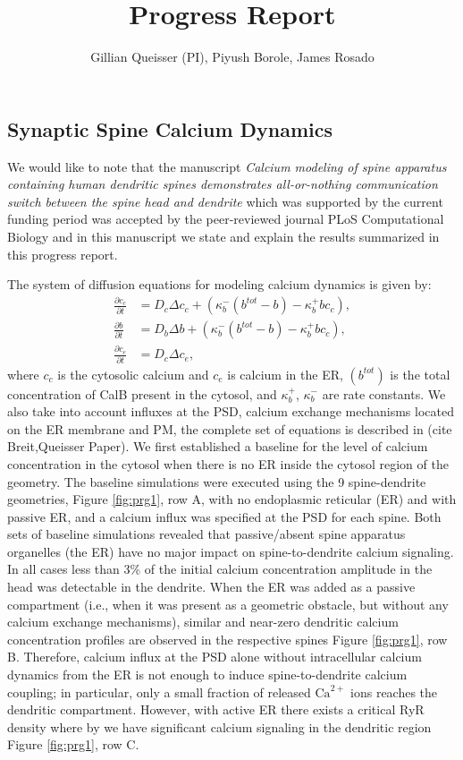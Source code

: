 \documentclass[10pt, letterpaper]{article}
\author{Gillian Queisser (PI), Piyush Borole, James Rosado}
\title{\vspace{-2cm}Progress Report}
\date{\vspace{-1cm}}
\begin{document}
\maketitle

\subsection*{Synaptic Spine Calcium Dynamics}
We would like to note that the manuscript \textit{Calcium modeling of spine apparatus containing human dendritic spines demonstrates all-or-nothing communication switch between the spine head and dendrite} which was supported by the current funding period {\color{red}was accepted by the peer-reviewed journal PLoS Computational Biology \cite{Rosado2022}} and in this manuscript we state and explain the results summarized in this progress report.

The system of diffusion equations \cite{Breit2018} for modeling calcium dynamics is given by:
\begin{align}
    \frac{\partial c_c}{\partial t} &= D_c\Delta c_c + (\kappa_b^-(b^{tot}-b)-\kappa_b^+bc_c),\\
    \frac{\partial b}{\partial t} &= D_b\Delta b + (\kappa_b^-(b^{tot}-b)-\kappa_b^+bc_c),\\
    \frac{\partial c_e}{\partial t} &= D_c\Delta c_e, 
\end{align}
where $c_c$ is the cytosolic calcium and $c_e$ is calcium in the ER, $(b^{tot})$ is the total concentration of CalB present in the cytosol, and $\kappa_b^+$, $\kappa_b^-$ are rate constants. We also take into account influxes at the PSD, calcium exchange mechanisms located on the ER membrane and PM, the complete set of equations is described in (cite Breit,Queisser Paper). We first established a baseline for the level of calcium concentration in the cytosol when there is no ER inside the cytosol region of the geometry. The baseline simulations were executed using the 9 spine-dendrite geometries,  Figure \ref{fig:prg1}, row A, with no endoplasmic reticular (ER) and with passive ER, and a calcium influx was specified at the PSD for each spine. Both sets of baseline simulations revealed that passive/absent spine apparatus organelles (the ER) have no major impact on spine-to-dendrite calcium signaling. In all cases less than 3\%  of the initial calcium concentration amplitude in the head was detectable in the dendrite. When the ER was added as a passive compartment (i.e., when it was present as a geometric obstacle, but without any calcium exchange mechanisms), similar and near-zero dendritic calcium concentration profiles are observed in the respective spines Figure \ref{fig:prg1}, row B. Therefore, calcium influx at the PSD alone without intracellular calcium dynamics from the ER is not enough to induce spine-to-dendrite calcium coupling; in particular, only a small fraction of released $\textrm{Ca}^{2+}$ ions reaches the dendritic compartment. However, with active ER there exists a critical RyR density where by we have significant calcium signaling in the dendritic region Figure \ref{fig:prg1}, row C.
\end{document}
